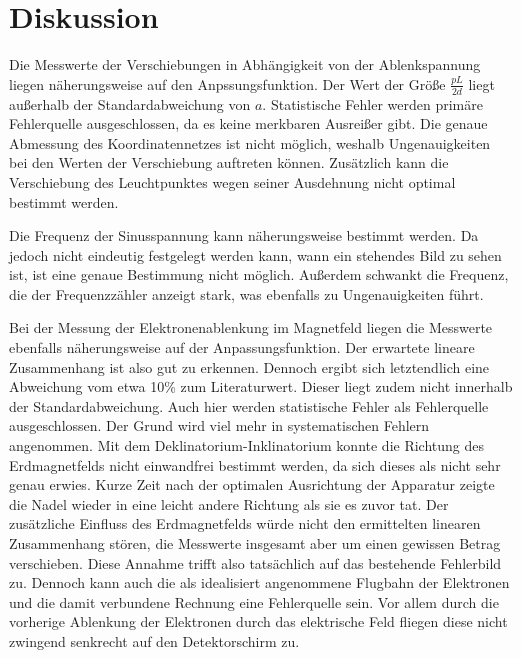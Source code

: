 \section{Diskussion}
\label{sec:Diskussion}

Die Messwerte der Verschiebungen in Abhängigkeit von der Ablenkspannung liegen näherungsweise auf den Anpssungsfunktion.
Der Wert der Größe $\frac{pL}{2d}$ liegt außerhalb der Standardabweichung von $a$. Statistische Fehler
werden primäre Fehlerquelle ausgeschlossen, da es keine merkbaren Ausreißer gibt. Die genaue Abmessung
des Koordinatennetzes ist nicht möglich, weshalb Ungenauigkeiten bei den Werten der Verschiebung auftreten können.
Zusätzlich kann die Verschiebung des Leuchtpunktes wegen seiner Ausdehnung nicht optimal bestimmt werden.

Die Frequenz der Sinusspannung kann näherungsweise bestimmt werden. Da jedoch nicht eindeutig
festgelegt werden kann, wann ein stehendes Bild zu sehen ist, ist eine genaue Bestimmung nicht möglich.
Außerdem schwankt die Frequenz, die der Frequenzzähler anzeigt stark, was ebenfalls zu Ungenauigkeiten führt.

Bei der Messung der Elektronenablenkung im Magnetfeld liegen die Messwerte ebenfalls näherungsweise auf der Anpassungsfunktion.
Der erwartete lineare Zusammenhang ist also gut zu erkennen. Dennoch ergibt sich letztendlich eine Abweichung vom etwa 10\% zum
Literaturwert. Dieser liegt zudem nicht innerhalb der Standardabweichung. Auch hier werden statistische Fehler als Fehlerquelle ausgeschlossen.
Der Grund wird viel mehr in systematischen Fehlern angenommen. Mit dem Deklinatorium-Inklinatorium konnte die Richtung des Erdmagnetfelds
nicht einwandfrei bestimmt werden, da sich dieses als nicht sehr genau erwies. Kurze Zeit nach der optimalen Ausrichtung der Apparatur
zeigte die Nadel wieder in eine leicht andere Richtung als sie es zuvor tat. Der zusätzliche Einfluss des Erdmagnetfelds würde nicht den
ermittelten linearen Zusammenhang stören, die Messwerte insgesamt aber um einen gewissen Betrag verschieben. Diese Annahme trifft also
tatsächlich auf das bestehende Fehlerbild zu. Dennoch kann auch die als idealisiert angenommene Flugbahn der Elektronen und die damit
verbundene Rechnung eine Fehlerquelle sein. Vor allem durch die vorherige Ablenkung der Elektronen durch das elektrische Feld fliegen
diese nicht zwingend senkrecht auf den Detektorschirm zu.
